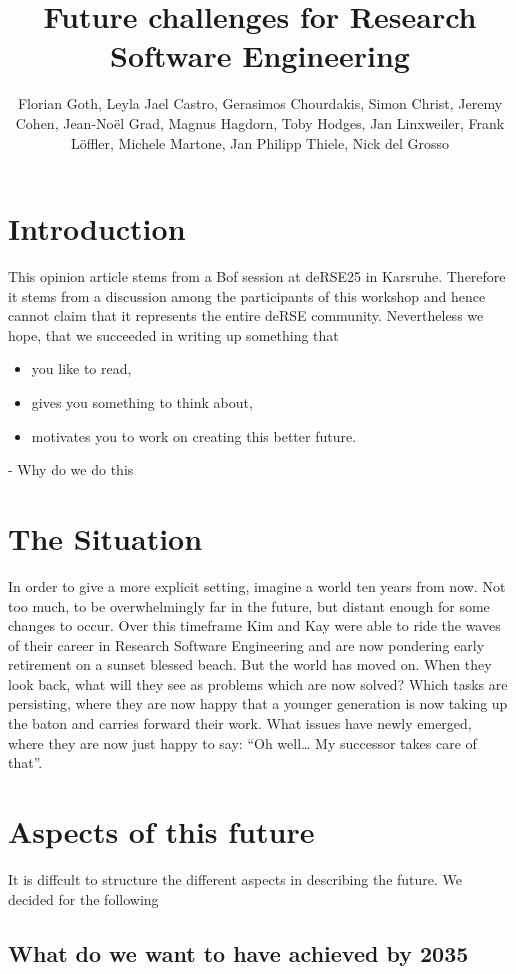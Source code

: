 \documentclass{eceasst}
\title{Future challenges for Research Software Engineering} %
\author{
Florian Goth\autref{1},
Leyla Jael Castro\autref{1},
Gerasimos Chourdakis\autref{1},
Simon Christ\autref{1},
Jeremy Cohen\autref{1},
Jean-Noël Grad\autref{1},
Magnus Hagdorn\autref{1},
Toby Hodges\autref{1},
Jan Linxweiler\autref{1},
Frank Löffler\autref{1},
Michele Martone\autref{1},
Jan Philipp Thiele\autref{1},
Nick del Grosso\autref{1}
} %
\institute{Fantasy University\autlabel{1}} %
\begin{document}
\maketitle

\section{Introduction}
This opinion article stems from a Bof session at deRSE25 in Karsruhe. Therefore it stems from a discussion
among the participants of this workshop and hence cannot claim that it represents the entire deRSE community.
Nevertheless we hope, that we succeeded in writing up something that
\begin{itemize}
\item you like to read,
\item gives you something to think about,
\item motivates you to work on creating this better future.
\end{itemize}

- Why do we do this

\section{The Situation}
In order to give a more explicit setting, imagine a world ten years from now.
Not too much, to be overwhelmingly far in the future, but distant enough for some changes to occur.
Over this timeframe Kim and Kay
were able to ride the waves of their career in Research Software Engineering and are now pondering early retirement on a sunset blessed beach.
But the world has moved on.
When they look back, what will they see as problems which are now solved?
Which tasks are persisting, where they are now happy that a younger generation is now taking up the baton and carries forward their work.
What issues have newly emerged, where they are now just happy to say: “Oh well… My successor takes care of that”.


\section{Aspects of this future}
It is diffcult to structure the different aspects in describing the future. We decided for the following

\subsection{What do we want to have achieved by 2035}
\end{document}

